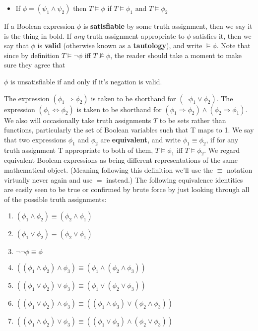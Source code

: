 \begin{definition}
\begin{itemize}
    \item If $\phi = (\psi_1 \wedge \psi_2)$ then $T \models \phi$ if $T \models \phi_1$ and $T \models \phi_2$
\end{itemize}
If a Boolean expression $\phi$ is \textbf{satisfiable} by some truth assignment, then we say it is the thing in bold. If \textit{any} truth assignment appropriate to $\phi$ satisfies it, then we say that $\phi$ is \textbf{valid} (otherwise known as a \textbf{tautology}), and write $\models \phi$. Note that since by definition $T \models \neg \phi$ iff $T \nvDash \phi$, the reader should take a moment to make sure they agree that
\begin{center}
    $\phi$ is unsatisfiable if and only if it's negation is valid.
\end{center}
\par The expression $(\phi_1 \Rightarrow \phi_2)$ is taken to be shorthand for $(\neg \phi_1 \vee \phi_2)$. The expression $(\phi_1 \iff \phi_2)$ is taken to be shorthand for $(\phi_1 \Rightarrow \phi_2) \wedge (\phi_2 \Rightarrow \phi_1)$. We also will occasionally take truth assignments $T$ to be sets rather than functions, particularly the set of Boolean variables such that T maps to 1. We say that two expressions $\phi_1$ and $\phi_2$ are \textbf{equivalent}, and write $\phi_1 \equiv \phi_2$, if for any truth assignment T appropriate to both of them, $T \models \phi_1$ iff $T \models \phi_2$. We regard equivalent Boolean expressions as being different representations of the same mathematical object. (Meaning following this definition we'll use the $\equiv$ notation virtually never again and use $=$ instead.) The following equivalence identities are easily seen to be true or confirmed by brute force by just looking through all of the possible truth assignments:
\begin{enumerate}
    \item $(\phi_1 \wedge \phi_2) \equiv (\phi_2 \wedge \phi_1)$
    \item $(\phi_1 \vee \phi_2) \equiv (\phi_2 \vee \phi_1)$
    \item $\neg \neg \phi \equiv \phi$
    \item $((\phi_1 \wedge \phi_2) \wedge \phi_3) \equiv (\phi_1 \wedge (\phi_2 \wedge \phi_3))$
    \item $((\phi_1 \vee \phi_2) \vee \phi_3) \equiv (\phi_1 \vee (\phi_2 \vee \phi_3))$
    \item $((\phi_1 \vee \phi_2) \wedge \phi_3) \equiv ((\phi_1 \wedge \phi_3) \vee (\phi_2 \wedge \phi_3))$
    \item $((\phi_1 \wedge \phi_2) \vee \phi_3) \equiv ((\phi_1 \vee \phi_3) \wedge (\phi_2 \vee \phi_3))$

\end{enumerate}
\end{definition}
